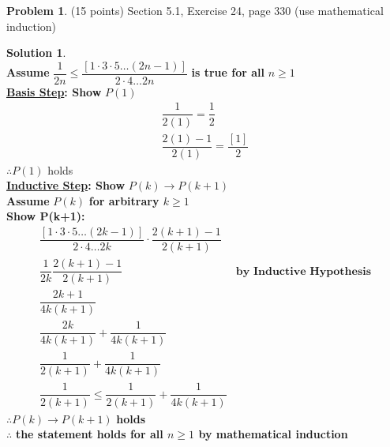 \documentclass{article}
\theoremstyle{definition}
\newtheorem{problem}{Problem}
\newtheorem*{solution}{Solution}
\begin{document}
\begin{problem} (15 points)
Section 5.1, Exercise 24, page 330 (use mathematical induction)
\end{problem}
\begin{solution} \ \\
\textbf{Assume} $\dfrac{1}{2n} \le \dfrac{[1 \cdot 3 \cdot 5 \dots (2n-1) ]}{2\cdot4\dots2n}$ \textbf{is true for all} $n \ge 1 $ \\
\textbf{\underline{Basis Step}: Show } $P(1)$ \\
\begin{align*}
  \dfrac{1}{2(1)} = \dfrac{1}{2}\\
  \dfrac{2(1) - 1}{2(1)} = \dfrac{[1]}{2}
\end{align*}
$\therefore P(1)$ holds \\
\textbf{\underline{Inductive Step}: Show } $P(k) \rightarrow P(k+1)$ \\
\textbf{Assume} $P(k)$ \textbf{for arbitrary $k \ge  1$} \\
\textbf{Show P(k+1):} \\
\begin{align*}
  \dfrac{[1 \cdot 3 \cdot 5 \dots (2k-1) ]}{2\cdot4\dots2k}\cdot \dfrac{2(k+1 )- 1}{2(k+1)} \\
  \dfrac{1}{2k}\dfrac{2(k+1 )- 1}{2(k+1)} &\textbf{by Inductive Hypothesis} \\
  \dfrac{2k+1}{4k(k+1)} \\
  \dfrac{2k}{4k(k+1)} + \dfrac{1}{4k(k+1)} \\
  \dfrac{1}{2(k+1)} + \dfrac{1}{4k(k+1)} \\
  \dfrac{1}{2(k+1)} \le \dfrac{1}{2(k+1)} + \dfrac{1}{4k(k+1)}
\end{align*}
$\therefore P(k) \rightarrow P(k+1)$ \textbf{holds}\\
$\therefore$ \textbf{the statement holds for all $n \ge 1 $ by mathematical induction}
\end{solution}
\end{document}

